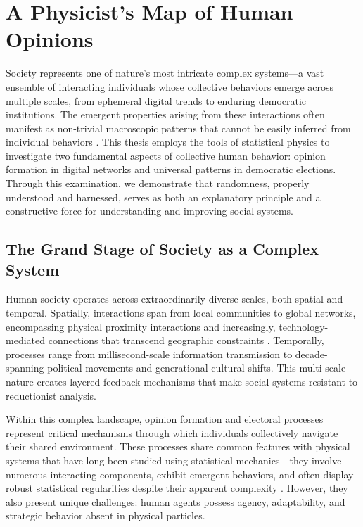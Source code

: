 \chapter{A Physicist's Map of Human Opinions}
\label{chap1}

Society represents one of nature's most intricate complex systems—a vast ensemble of interacting individuals whose collective behaviors emerge across multiple scales, from ephemeral digital trends to enduring democratic institutions. The emergent properties arising from these interactions often manifest as non-trivial macroscopic patterns that cannot be easily inferred from individual behaviors \cite{galam2012sociophysics}. This thesis employs the tools of statistical physics to investigate two fundamental aspects of collective human behavior: opinion formation in digital networks and universal patterns in democratic elections. Through this examination, we demonstrate that randomness, properly understood and harnessed, serves as both an explanatory principle and a constructive force for understanding and improving social systems.

\section{The Grand Stage of Society as a Complex System}

Human society operates across extraordinarily diverse scales, both spatial and temporal. Spatially, interactions span from local communities to global networks, encompassing physical proximity interactions and increasingly, technology-mediated connections that transcend geographic constraints \cite{social-media-as-public-opinion}. Temporally, processes range from millisecond-scale information transmission to decade-spanning political movements and generational cultural shifts. This multi-scale nature creates layered feedback mechanisms that make social systems resistant to reductionist analysis.

Within this complex landscape, opinion formation and electoral processes represent critical mechanisms through which individuals collectively navigate their shared environment. These processes share common features with physical systems that have long been studied using statistical mechanics—they involve numerous interacting components, exhibit emergent behaviors, and often display robust statistical regularities despite their apparent complexity \cite{galam1982sociophysics, galam1991towards}. However, they also present unique challenges: human agents possess agency, adaptability, and strategic behavior absent in physical particles.

